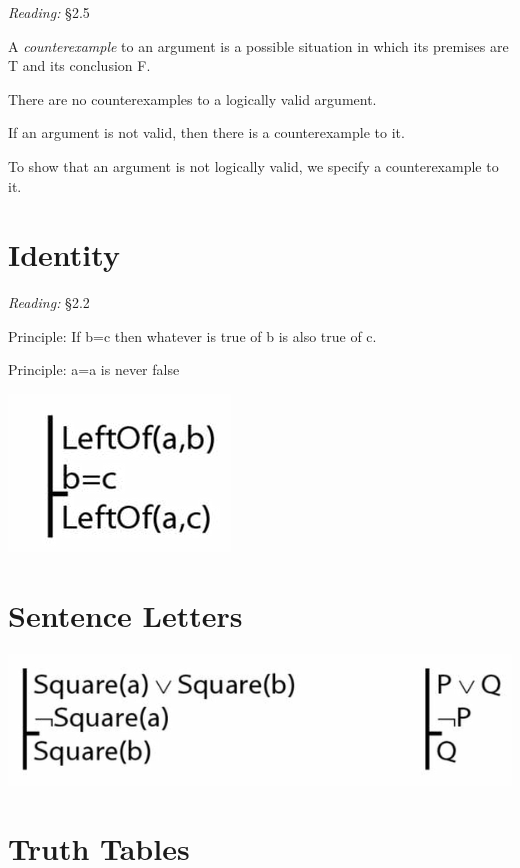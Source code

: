 \documentclass[12pt]{extarticle}
\begin{document}
\begin{multicols*}{3}
\emph{Reading:} §2.5
 
A \emph{counterexample} to an argument is a possible situation in which its premises are T and its conclusion F.
 
There are no counterexamples to a logically valid argument.
 
If an argument is not valid, then there is a counterexample to it.
 
To show that an argument is not logically valid, we specify a counterexample to it.
 
 
 
\section{Identity}
 
\emph{Reading:} §2.2
 
Principle: If b=c then whatever is true of b is also true of c.
 
Principle: a=a is never false
 
\begin{center}
\includegraphics[scale=0.3]{img/arg_identity.png}
\end{center}
 
 
\section{Sentence Letters}
 
\begin{center}
\includegraphics[scale=0.3]{img/sentence_letters.png}
\end{center}
 
 
\section{Truth Tables}
 

\end{multicols*}
\end{document}

